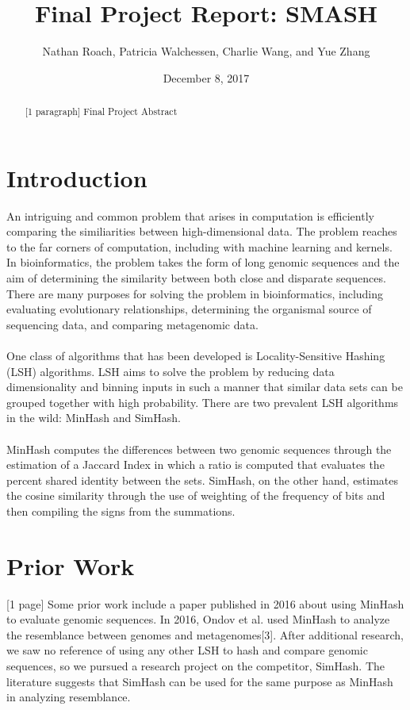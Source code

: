 \documentclass[12pt, letterpaper]{article}
\title{Final Project Report: SMASH}
\author{Nathan Roach, Patricia Walchessen, Charlie Wang, and Yue Zhang}
\date{December 8, 2017}
\begin{document}
\maketitle

\begin{abstract}
	[1 paragraph] Final Project Abstract
\end{abstract}


\section*{Introduction}
An intriguing and common problem that arises in computation is efficiently comparing the similiarities between high-dimensional data. The problem reaches to the far corners of computation, including with machine learning and kernels. In bioinformatics, the problem takes the form of long genomic sequences and the aim of determining the similarity between both close and disparate sequences. There are many purposes for solving the problem in bioinformatics, including evaluating evolutionary relationships, determining the organismal source of sequencing data, and comparing metagenomic data. \\ \\
One class of algorithms that has been developed is Locality-Sensitive Hashing (LSH) algorithms. LSH aims to solve the problem by reducing data dimensionality and binning inputs in such a manner that similar data sets can be grouped together with high probability. There are two prevalent LSH algorithms in the wild: MinHash and SimHash. \\ \\
MinHash computes the differences between two genomic sequences through the estimation of a Jaccard Index in which a ratio is computed that evaluates the percent shared identity between the sets. SimHash, on the other hand, estimates the cosine similarity through the use of weighting of the frequency of bits and then compiling the signs from the summations.

\section*{Prior Work}
[1 page] Some prior work include a paper published in 2016 about using MinHash to evaluate genomic sequences. In 2016, Ondov et al. used MinHash to analyze the resemblance between genomes and metagenomes[3]. After additional research, we saw no reference of using any other LSH to hash and compare genomic sequences, so we pursued a research project on the competitor, SimHash. The literature suggests that SimHash can be used for the same purpose as MinHash in analyzing resemblance. 
\end{document}
